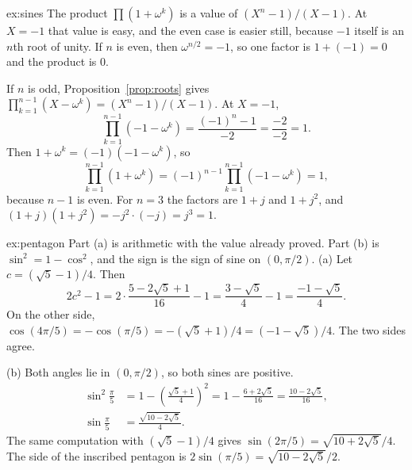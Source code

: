 \begin{solution}{ex:sines}
\idea The product $\prod(1+\omega^k)$ is a value of $(X^n-1)/(X-1)$. At $X=-1$ that value is easy, and the even case is easier still, because $-1$ itself is an $n$th root of unity.
\writeup If $n$ is even, then $\omega^{n/2}=-1$, so one factor is $1+(-1)=0$ and the product is $0$.

If $n$ is odd, Proposition~\ref{prop:roots} gives $\prod_{k=1}^{n-1}(X-\omega^k)=(X^n-1)/(X-1)$. At $X=-1$,
\[
\prod_{k=1}^{n-1}(-1-\omega^k)=\frac{(-1)^n-1}{-2}=\frac{-2}{-2}=1.
\]
Then $1+\omega^k=(-1)(-1-\omega^k)$, so
\[
\prod_{k=1}^{n-1}(1+\omega^k)=(-1)^{n-1}\prod_{k=1}^{n-1}(-1-\omega^k)=1,
\]
because $n-1$ is even. For $n=3$ the factors are $1+j$ and $1+j^2$, and $(1+j)(1+j^2)=-j^2\cdot(-j)=j^3=1$.
\end{solution}

\begin{solution}{ex:pentagon}
\idea Part (a) is arithmetic with the value already proved. Part (b) is $\sin^2=1-\cos^2$, and the sign is the sign of sine on $(0,\pi/2)$.
\writeup (a) Let $c=(\sqrt5-1)/4$. Then
\[
2c^2-1=2\cdot\frac{5-2\sqrt5+1}{16}-1=\frac{3-\sqrt5}4-1=\frac{-1-\sqrt5}4.
\]
On the other side, $\cos(4\pi/5)=-\cos(\pi/5)=-({\sqrt5}+1)/4=(-1-\sqrt5)/4$. The two sides agree.

(b) Both angles lie in $(0,\pi/2)$, so both sines are positive.
\begin{align*}
\sin^2\frac\pi5&=1-\left(\frac{\sqrt5+1}4\right)^2=1-\frac{6+2\sqrt5}{16}=\frac{10-2\sqrt5}{16},\\
\sin\frac\pi5&=\frac{\sqrt{10-2\sqrt5}}4.
\end{align*}
The same computation with $(\sqrt5-1)/4$ gives $\sin(2\pi/5)=\sqrt{10+2\sqrt5}/4$. The side of the inscribed pentagon is $2\sin(\pi/5)=\sqrt{10-2\sqrt5}/2$.
\end{solution}

